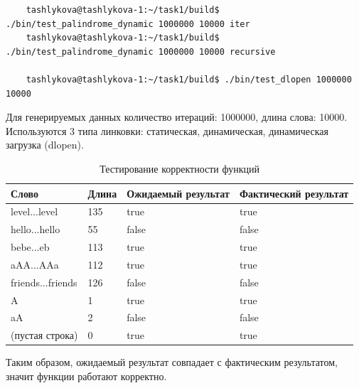\documentclass[14pt]{extreport}
\begin{document}
{\begin{footnotesize}
\begin{verbatim}
    tashlykova@tashlykova-1:~/task1/build$ ./bin/test_palindrome_dynamic 1000000 10000 iter
    tashlykova@tashlykova-1:~/task1/build$ ./bin/test_palindrome_dynamic 1000000 10000 recursive

    tashlykova@tashlykova-1:~/task1/build$ ./bin/test_dlopen 1000000 10000
\end{verbatim}
\end{footnotesize}
Для генерируемых данных количество итераций: 1000000, длина слова: 10000. Используются 3 типа линковки: статическая, динамическая, динамическая загрузка (dlopen). 
\begin{table}[H]
\centering
\renewcommand{\tablename}{\small{Таблица.}}
\caption{\small Тестирование корректности функций}
\label{tab2}
\begin{tabular}{|p{4cm}|p{2cm}|p{4cm}|p{4cm}|}
    \hline
    Слово & Длина & Ожидаемый результат	& Фактический результат\\
    \hline
    level...level & 135 & true & true \\
    \hline
    hello...hello & 55 & false & false \\
    \hline
    bebe...eb & 113 & true & true \\
    \hline
    aAA...AAa & 112 & true & true \\
    \hline
    friends...friends & 126 & false & false \\
    \hline
    A & 1 & true & true\\
    \hline
    aA & 2 & false & false \\
    \hline
    (пустая строка) & 0 & true & true \\
    \hline
\end{tabular}
\end{table}
Таким образом, ожидаемый результат совпадает с фактическим результатом, значит функции работают корректно.

}
\end{document}
